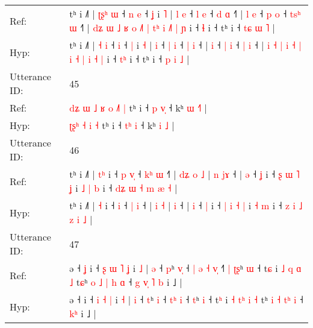 \documentclass[10pt]{article}
\DeclareRobustCommand{\hl}[1]{{\textcolor{red}{#1}}}
\begin{document}
\begin{longtable}{ll}
Ref: & tʰ i ˩˥ | \hl{ʈ}\hl{ʂ}\hl{ʰ} \hl{ɯ} ˧\hl{ }\hl{n} \hl{e} ˧ \hl{ʝ} i \hl{˥} |\hl{ }\hl{l} \hl{e} ˧ \hl{l} \hl{e} ˧ \hl{d} \hl{ɑ} ˧\hl{˥} |\hl{ }\hl{l} \hl{e} ˧ \hl{p} \hl{o} ˧ \hl{t}\hl{s}\hl{ʰ} \hl{ɯ} ˧\hl{˥} | \hl{d}\hl{ʑ} \hl{ɯ} \hl{˩} \hl{ʁ} \hl{o} \hl{˩}\hl{˥} \hl{|} \hl{t}\hl{ʰ} \hl{i} \hl{˩}\hl{˥} \hl{|} \hl{ɲ} i ˧ \hl{}\hl{ɬ} i ˧ tʰ i ˧ \hl{t}\hl{ɕ} \hl{ɯ} \hl{˥} |
 \\
Hyp: & tʰ i ˩˥ | \hl{}\hl{}\hl{˧} \hl{i} ˧\hl{}\hl{} \hl{i} ˧ \hl{|} i \hl{˧} |\hl{}\hl{} \hl{i} ˧ \hl{|} \hl{i} ˧ \hl{|} \hl{i} ˧\hl{} |\hl{}\hl{} \hl{i} ˧ \hl{|} \hl{i} ˧ \hl{}\hl{}\hl{|} \hl{i} ˧\hl{} | \hl{}\hl{i} \hl{˧} \hl{|} \hl{i} \hl{˧} \hl{}\hl{|} \hl{i} \hl{}\hl{˧} \hl{|} \hl{}\hl{i} \hl{˧} \hl{|} i ˧ \hl{t}\hl{ʰ} i ˧ tʰ i ˧ \hl{}\hl{p} \hl{i} \hl{˩} |
 \\
\midrule
Utterance ID: & 45 \\
Ref: & \hl{d}\hl{ʑ}\hl{ }\hl{ɯ}\hl{ }\hl{˩}\hl{ }\hl{ʁ} \hl{o} \hl{˩}\hl{˥} \hl{|} tʰ i ˧ \hl{p}\hl{ }\hl{v}\hl{̩} ˧ kʰ \hl{ɯ} \hl{˧}\hl{˥} |
 \\
Hyp: & \hl{}\hl{}\hl{}\hl{}\hl{}\hl{ʈ}\hl{ʂ}\hl{ʰ} \hl{˧} \hl{}\hl{i} \hl{˧} tʰ i ˧ \hl{t}\hl{ʰ}\hl{ }\hl{i} ˧ kʰ \hl{i} \hl{}\hl{˩} |
 \\
\midrule
Utterance ID: & 46 \\
Ref: & tʰ i ˩˥ | \hl{t}\hl{ʰ} i ˧\hl{ }\hl{p} \hl{v}\hl{̩} ˧ \hl{k}\hl{ʰ} \hl{ɯ} ˧\hl{˥} |\hl{ }\hl{d}\hl{ʑ} \hl{o} \hl{˩} |\hl{ }\hl{n} \hl{j}\hl{ɤ} ˧ | \hl{ə} ˧ \hl{ʝ} i ˧ \hl{ʂ} \hl{ɯ} \hl{˥} \hl{ʝ} i\hl{ }\hl{˩} \hl{|} \hl{b} i ˧ \hl{d}\hl{ʑ} \hl{ɯ} \hl{˧} \hl{m} \hl{æ} \hl{˧} |
 \\
Hyp: & tʰ i ˩˥ | \hl{}\hl{˧} i ˧\hl{}\hl{} \hl{}\hl{i} ˧ \hl{}\hl{|} \hl{i} ˧\hl{} |\hl{}\hl{}\hl{} \hl{i} \hl{˧} |\hl{}\hl{} \hl{}\hl{i} ˧ | \hl{i} ˧ \hl{|} i ˧ \hl{|} \hl{i} \hl{˧} \hl{|} i\hl{}\hl{} \hl{˧} \hl{m} i ˧ \hl{}\hl{z} \hl{i} \hl{˩} \hl{z} \hl{i} \hl{˩} |
 \\
\midrule
Utterance ID: & 47 \\
Ref: & ə ˧\hl{ }\hl{ʝ} i ˧\hl{ }\hl{ʂ} \hl{ɯ} \hl{˥} \hl{ʝ} i \hl{˩} | \hl{ə} ˧ \hl{p}ʰ \hl{v}\hl{̩} ˧\hl{ }\hl{|} \hl{ə}\hl{ }\hl{˧} \hl{v}\hl{̩} ˧\hl{˥}\hl{ }\hl{|} \hl{ʈ}\hl{ʂ}ʰ \hl{ɯ} ˧ t\hl{ɕ} i \hl{˩} \hl{}\hl{q} \hl{ɑ} \hl{˩} t\hl{ɕ}ʰ \hl{o} \hl{˩} \hl{|}\hl{ }\hl{h} \hl{ɑ} ˧\hl{ }\hl{g}\hl{ }\hl{v}\hl{̩} \hl{˥}\hl{ }\hl{b} i ˩ |
 \\
Hyp: & ə ˧\hl{}\hl{} i ˧\hl{}\hl{} \hl{i} \hl{˧} \hl{|} i \hl{˧} | \hl{i} ˧ \hl{t}ʰ \hl{}\hl{i} ˧\hl{}\hl{} \hl{}\hl{t}\hl{ʰ} \hl{}\hl{i} ˧\hl{}\hl{}\hl{} \hl{}\hl{t}ʰ \hl{i} ˧ t\hl{ʰ} i \hl{˧} \hl{t}\hl{ʰ} \hl{i} \hl{˧} t\hl{}ʰ \hl{i} \hl{˧} \hl{}\hl{t}\hl{ʰ} \hl{i} ˧\hl{}\hl{}\hl{}\hl{}\hl{} \hl{}\hl{k}\hl{ʰ} i ˩ |

\end{longtable}
\end{document}
